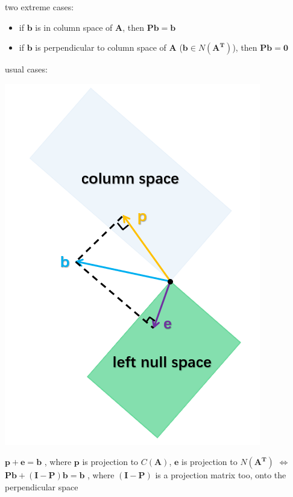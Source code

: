 \documentclass[12pt, a4paper]{article}
\begin{document}
{\newline
two extreme cases: 
\begin{itemize}
	\item if ${\mathbf{b}}$ is in column space of ${\mathbf{A}}$, then ${\mathbf{P}}{\mathbf{b}} = {\mathbf{b}}$
	\item if ${\mathbf{b}}$ is perpendicular to column space of ${\mathbf{A}}$ (${\mathbf{b}} \in N({\mathbf{A^{T}}})$), then ${\mathbf{P}}{\mathbf{b}} = {\mathbf{0}}$
\end{itemize}
usual cases:
\begin{center}
	\includegraphics[scale=0.6]{figures/S16-2.png}
\end{center}
${\mathbf{p}} + {\mathbf{e}} = {\mathbf{b}}$ , where ${\mathbf{p}}$ is projection to $C({\mathbf{A}})$, ${\mathbf{e}}$ is projection to $N({\mathbf{A^{T}}})$
\newline
$\Longleftrightarrow$ ${\mathbf{P}}{\mathbf{b}}+({\mathbf{I}}-{\mathbf{P}}){\mathbf{b}} = {\mathbf{b}}$ , where $({\mathbf{I}}-{\mathbf{P}})$ is a projection matrix too, onto the perpendicular space
\vspace{31pt}
\newline
}
\end{document}
